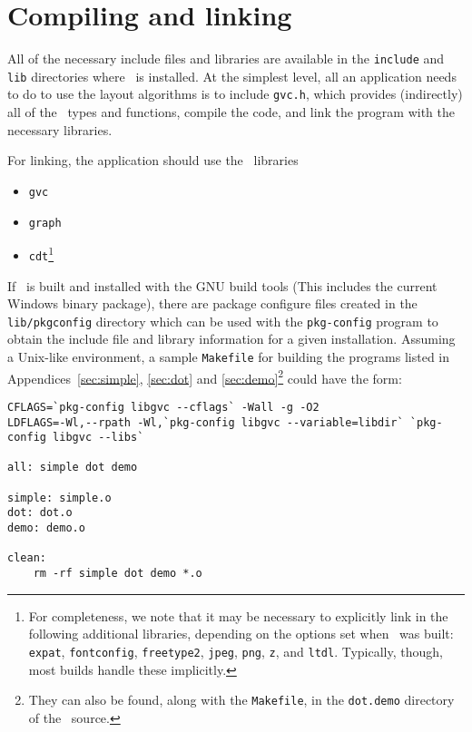 \section{Compiling and linking}
\label{sec:build}
All of the necessary include files and libraries are available
in the {\tt include} and {\tt lib} directories where \gviz\
is installed. At the simplest level, all an application needs
to do to use the layout algorithms is to include {\tt gvc.h},
which provides (indirectly) all of the \gviz\ types and functions,
compile the code,
and link the program with the necessary libraries.

For linking, the application should use the \gviz\ libraries 
\begin{itemize}
\item {\tt gvc}
\item {\tt graph}
\item {\tt cdt}\footnote{
For completeness, we note that it may be necessary to explicitly
link in the following additional libraries, depending
on the options set when \gviz\ was built:
{\tt expat},
{\tt fontconfig},
{\tt freetype2},
{\tt jpeg},
{\tt png},
{\tt z}, and
{\tt ltdl}.
Typically, though, most builds handle these implicitly.}
\end{itemize}

If \gviz\ is built and installed with the GNU build tools
(This includes the current Windows binary package),
there are package configure files created in the {\tt lib/pkgconfig} 
directory which can be used with the {\tt pkg-config} program
to obtain the include file and library information for 
a given installation.
Assuming a Unix-like environment, a sample {\tt Makefile} for building the
programs listed in Appendices~\ref{sec:simple}, \ref{sec:dot} 
and \ref{sec:demo}\footnote{They
can also be found, along with the {\tt Makefile}, in the
{\tt dot.demo} directory of the \gviz\ source.}
could have the form:

\begin{verbatim}
CFLAGS=`pkg-config libgvc --cflags` -Wall -g -O2
LDFLAGS=-Wl,--rpath -Wl,`pkg-config libgvc --variable=libdir` `pkg-config libgvc --libs`

all: simple dot demo

simple: simple.o
dot: dot.o
demo: demo.o

clean:
    rm -rf simple dot demo *.o
\end{verbatim}

